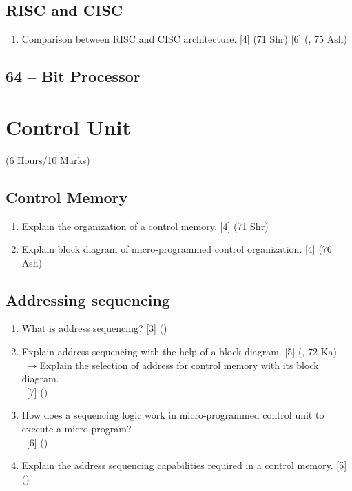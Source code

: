 \documentclass[12pt]{article}
\newcommand{\lb}{\\$\left|\rightarrow\right.$}
\newcommand{\enter}{\\\textcolor{white}{1}}
\begin{document}
	\subsection{RISC and CISC}
	\begin{enumerate}
		\item Comparison between RISC and CISC architecture. \hfill [4] (71 Shr) [6] (, 75 Ash)
	\end{enumerate}
	\subsection{64 – Bit Processor}

	\pagebreak
\section{Control Unit}
	\begin{center}(6 Hours/10 Marks)\end{center} 
	\subsection{Control Memory}
		\begin{enumerate}
			\item Explain the organization of a control memory. \hfill [4] (71 Shr)
			
			\item Explain block diagram of micro-programmed control organization. \hfill [4] (76 Ash)
		\end{enumerate}					
			
	\subsection{Addressing sequencing}
		\begin{enumerate}
			\item What is address sequencing? \hfill [3] ()
			
			\item Explain address sequencing with the help of a block diagram. \hfill [5] (, 72 Ka)
			\lb Explain the selection of address for control memory with its block diagram.
			\enter\hfill [7] ()
			
			\item How does a sequencing logic work in micro-programmed control unit to execute a micro-program?
			\enter\hfill [6] ()
			
			\item Explain the address sequencing capabilities required in a control memory. \hfill [5] ()
		\end{enumerate}
	
\end{document}
